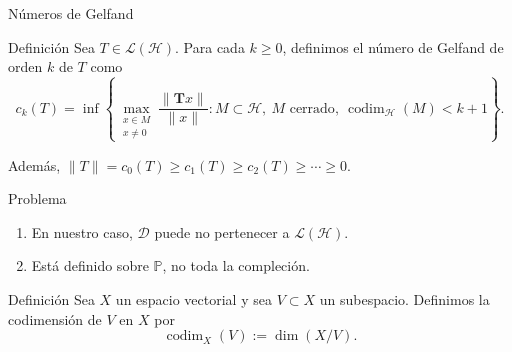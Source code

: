 \documentclass[aspectratio=169,10pt]{beamer}
\newcommand{\Poly}{\mathbb{P}}
\newcommand{\D}{\mathcal{D}}
\begin{document}
\begin{frame}{Números de Gelfand}
  \scriptsize
  \begin{block}{Definición}
    Sea \(T\in\mathcal L(\mathcal H)\). Para cada \(k\ge 0\), definimos el número de Gelfand de orden \(k\) de \(T\) como
    \[
      c_k(T)=\inf\left\{\max_{\substack{x\in M\\ x\neq0}}
      \frac{\|\mathbf Tx\|}{\|x\|}:M\subset \mathcal H,\ M\text{ cerrado},\ \operatorname{codim}_{\mathcal H}(M)<k+1\right\}.
    \]
  \end{block}

  Además,
  \(
  \|T\|=c_0(T)\ge c_1(T)\ge c_2(T)\ge \cdots \ge 0.
  \)

  \begin{alertblock}{Problema}
    \begin{enumerate}
      \item En nuestro caso, \(\D\) puede no pertenecer a \(\mathcal L(\mathcal H)\).
      \item Está definido sobre \(\Poly\), no toda la compleción.
    \end{enumerate}
  \end{alertblock}

  \begin{block}{Definición}
    Sea \(X\) un espacio vectorial y sea \(V\subset X\) un subespacio. Definimos la codimensión de \(V\) en \(X\) por
    \[
      \operatorname{codim}_{X}(V):=\dim(X/V).
    \]
  \end{block}
\end{frame}
\end{document}
